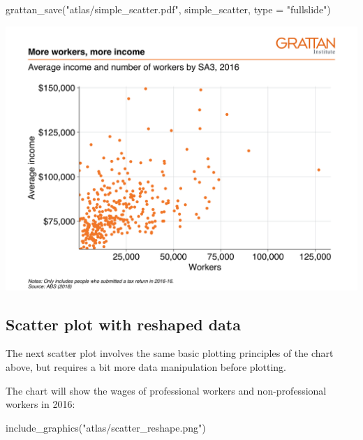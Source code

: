 \documentclass[
]{book}
\newenvironment{Shaded}{\begin{snugshade}}{\end{snugshade}}
\newcommand{\AttributeTok}[1]{\textcolor[rgb]{0.77,0.63,0.00}{#1}}
\newcommand{\FunctionTok}[1]{\textcolor[rgb]{0.00,0.00,0.00}{#1}}
\newcommand{\NormalTok}[1]{#1}
\newcommand{\StringTok}[1]{\textcolor[rgb]{0.31,0.60,0.02}{#1}}
\begin{document}
\begin{Shaded}
\begin{Highlighting}[]
\FunctionTok{grattan\_save}\NormalTok{(}\StringTok{"atlas/simple\_scatter.pdf"}\NormalTok{, simple\_scatter, }\AttributeTok{type =} \StringTok{"fullslide"}\NormalTok{)}
\end{Highlighting}
\end{Shaded}

\includegraphics[width=44.44in]{atlas/simple_scatter}

\hypertarget{scatter-plot-with-reshaped-data}{%
\subsection{Scatter plot with reshaped data}\label{scatter-plot-with-reshaped-data}}

The next scatter plot involves the same basic plotting principles of the chart above, but requires a bit more data manipulation before plotting.

The chart will show the wages of professional workers and non-professional workers in 2016:

\begin{Shaded}
\begin{Highlighting}[]
\FunctionTok{include\_graphics}\NormalTok{(}\StringTok{"atlas/scatter\_reshape.png"}\NormalTok{)}
\end{Highlighting}
\end{Shaded}
\end{document}
